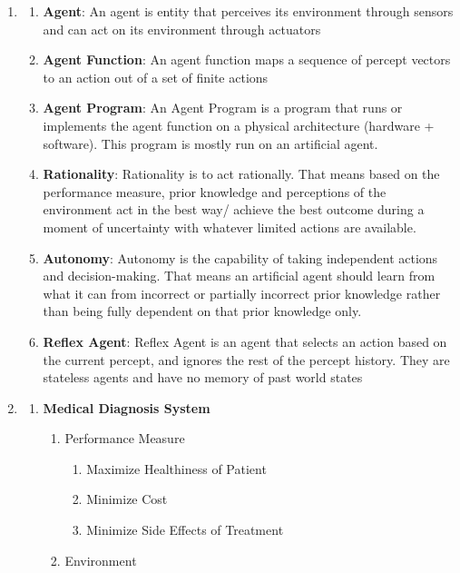 \documentclass[12pt,letterpaper]{article}
\begin{document}
\begin{enumerate}
    \item
        \begin{enumerate}
            \item \textbf{Agent}: An agent is entity that perceives its environment through sensors and can act on its environment through actuators
            \item \textbf{Agent Function}: An agent function maps a sequence of percept vectors to an action out of a set of finite actions
            \item \textbf{Agent Program}: An Agent Program is a program that runs or implements the agent function on a physical architecture (hardware + software). This program is mostly run on an artificial agent.
            \item \textbf{Rationality}:  Rationality is to act rationally. That means based on the performance measure, prior knowledge and perceptions of the environment act in the best way/ achieve the best outcome during a moment of uncertainty with whatever limited actions are available.
            \item \textbf{Autonomy}: Autonomy is the capability of taking independent actions and decision-making. That means an artificial agent  should learn from what it can from incorrect or partially incorrect prior knowledge rather than being fully dependent on that prior knowledge only.
            \item \textbf{Reflex Agent}: Reflex Agent is an agent that selects an action based on the current percept, and ignores the rest of the percept history. They are stateless agents and have no memory of past world states
        \end{enumerate}
    \item 
    \begin{enumerate}
        \item \textbf{Medical Diagnosis System}
            \begin{enumerate}
            \item Performance Measure
                \begin{enumerate}
                \item Maximize Healthiness of Patient
                \item Minimize Cost
                \item Minimize Side Effects of Treatment
                \end{enumerate}
            \item Environment
                \begin{enumerate}

\end{enumerate}
\end{enumerate}
\end{enumerate}
\end{enumerate}
\end{document}
